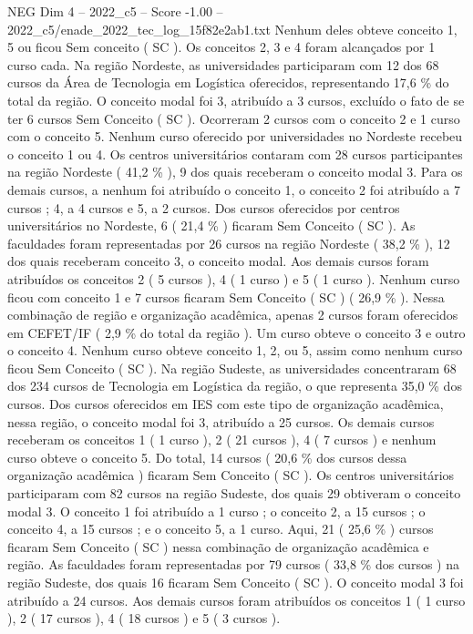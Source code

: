 \begin{textsample}{NEG Dim 4 – 2022\_c5 – Score -1.00 – 2022\_c5/enade\_2022\_tec\_log\_15f82e2ab1.txt}
Nenhum deles obteve conceito 1, 5 ou ficou Sem conceito ( SC ).
Os conceitos 2, 3 e 4 foram alcançados por 1 curso cada.
Na região Nordeste, as universidades participaram com 12 dos 68 cursos da Área de Tecnologia em Logística oferecidos, representando 17,6 \% do total da região.
O conceito modal foi 3, atribuído a 3 cursos, excluído o fato de se ter 6 cursos Sem Conceito ( SC ).
Ocorreram 2 cursos com o conceito 2 e 1 curso com o conceito 5.
Nenhum curso oferecido por universidades no Nordeste recebeu o conceito 1 ou 4.
Os centros universitários contaram com 28 cursos participantes na região Nordeste ( 41,2 \% ), 9 dos quais receberam o conceito modal 3.
Para os demais cursos, a nenhum foi atribuído o conceito 1, o conceito 2 foi atribuído a 7 cursos ; 4, a 4 cursos e 5, a 2 cursos.
Dos cursos oferecidos por centros universitários no Nordeste, 6 ( 21,4 \% ) ficaram Sem Conceito ( SC ).
As faculdades foram representadas por 26 cursos na região Nordeste ( 38,2 \% ), 12 dos quais receberam conceito 3, o conceito modal.
Aos demais cursos foram atribuídos os conceitos 2 ( 5 cursos ), 4 ( 1 curso ) e 5 ( 1 curso ).
Nenhum curso ficou com conceito 1 e 7 cursos ficaram Sem Conceito ( SC ) ( 26,9 \% ).
Nessa combinação de região e organização acadêmica, apenas 2 cursos foram oferecidos em CEFET/IF ( 2,9 \% do total da região ).
Um curso obteve o conceito 3 e outro o conceito 4.
Nenhum curso obteve conceito 1, 2, ou 5, assim como nenhum curso ficou Sem Conceito ( SC ).
Na região Sudeste, as universidades concentraram 68 dos 234 cursos de Tecnologia em Logística da região, o que representa 35,0 \% dos cursos.
Dos cursos oferecidos em IES com este tipo de organização acadêmica, nessa região, o conceito modal foi 3, atribuído a 25 cursos.
Os demais cursos receberam os conceitos 1 ( 1 curso ), 2 ( 21 cursos ), 4 ( 7 cursos ) e nenhum curso obteve o conceito 5.
Do total, 14 cursos ( 20,6 \% dos cursos dessa organização acadêmica ) ficaram Sem Conceito ( SC ).
Os centros universitários participaram com 82 cursos na região Sudeste, dos quais 29 obtiveram o conceito modal 3.
O conceito 1 foi atribuído a 1 curso ; o conceito 2, a 15 cursos ; o conceito 4, a 15 cursos ; e o conceito 5, a 1 curso.
Aqui, 21 ( 25,6 \% ) cursos ficaram Sem Conceito ( SC ) nessa combinação de organização acadêmica e região.
As faculdades foram representadas por 79 cursos ( 33,8 \% dos cursos ) na região Sudeste, dos quais 16 ficaram Sem Conceito ( SC ).
O conceito modal 3 foi atribuído a 24 cursos.
Aos demais cursos foram atribuídos os conceitos 1 ( 1 curso ), 2 ( 17 cursos ), 4 ( 18 cursos ) e 5 ( 3 cursos ).

\end{textsample}
